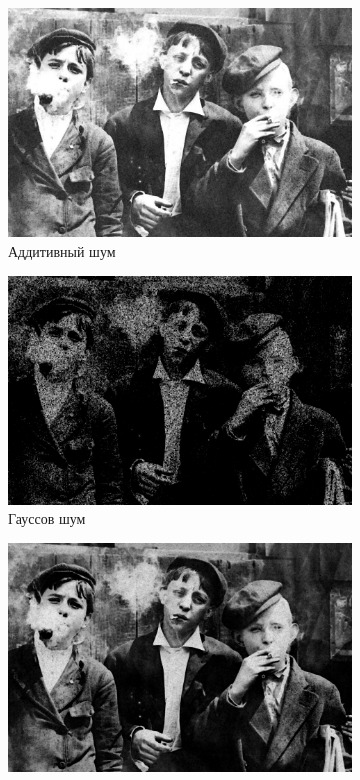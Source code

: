 \begin{figure}[ht!]
\begin{subfigure}[b]{0.5\linewidth}
      \includegraphics[width=0.95\linewidth]{../Rang_Filter/Rang_Additive_noise_(k=3,r=1).jpg} 
      \caption{Аддитивный шум} 
      \label{rang_3_1:c} 
      \vspace{4ex}
    \end{subfigure}%
    \begin{subfigure}[b]{0.5\linewidth}
      \centering
      \includegraphics[width=0.95\linewidth]{../Rang_Filter/Rang_Gaussian_noise_(k=3,r=1).jpg} 
      \caption{Гауссов шум} 
      \label{rang_3_1:d} 
      \vspace{4ex}
    \end{subfigure}
    \begin{subfigure}[b]{0.5\linewidth}
      \centering
      \includegraphics[width=0.95\linewidth]{../Rang_Filter/Rang_Poisson_noise_(k=3,r=1).jpg} 

\end{subfigure}
\end{figure}
